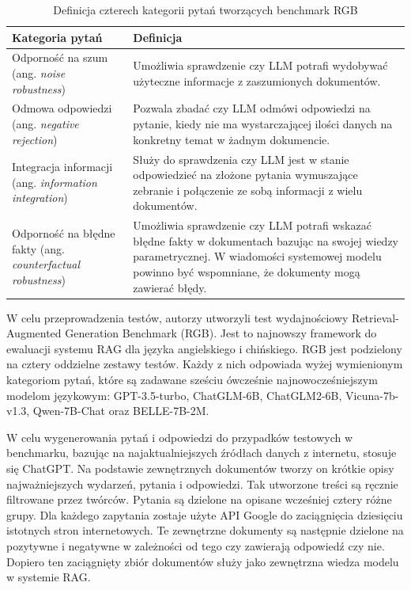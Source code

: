     \begin{table}[h]
        \centering
        \caption{ Definicja czterech kategorii pytań tworzących benchmark RGB }
        \begin{tabularx}{\textwidth}{|p{4.5cm}|X|}
        \hline
        \textbf{Kategoria pytań} & \textbf{Definicja} \\
        \hline
        Odporność na szum (ang. \textit{noise robustness}) & Umożliwia sprawdzenie czy LLM potrafi wydobywać użyteczne informacje z zaszumionych dokumentów.  \\ \hline
        
        Odmowa odpowiedzi (ang. \textit{negative rejection}) & Pozwala zbadać czy LLM odmówi odpowiedzi na pytanie, kiedy nie ma wystarczającej ilości danych na konkretny temat w żadnym dokumencie.  \\ \hline
        
        Integracja informacji (ang. \textit{information integration}) & Służy do sprawdzenia czy LLM jest w stanie odpowiedzieć na złożone pytania wymuszające zebranie i połączenie ze sobą informacji z wielu dokumentów. \\ \hline

        Odporność na błędne fakty (ang. \textit{counterfactual robustness}) & Umożliwia sprawdzenie czy LLM potrafi wskazać błędne fakty w dokumentach bazując na swojej wiedzy parametrycznej. W wiadomości systemowej modelu powinno być wspomniane, że dokumenty mogą zawierać błędy. \\ \hline
        \end{tabularx}
        \label{rgb_kategorie_pytan}
    \end{table}

    \noindent W celu przeprowadzenia testów, autorzy utworzyli test wydajnościowy Retrieval-Augmented Generation Benchmark (RGB). Jest to najnowszy framework do ewaluacji systemu RAG dla języka angielskiego i chińskiego. RGB jest podzielony na cztery oddzielne zestawy testów. Każdy z nich odpowiada wyżej wymienionym kategoriom pytań, które są zadawane sześciu ówcześnie najnowocześniejszym modelom językowym: GPT-3.5-turbo, ChatGLM-6B, ChatGLM2-6B, Vicuna-7b-v1.3, Qwen-7B-Chat oraz BELLE-7B-2M.

    W celu wygenerowania pytań i odpowiedzi do przypadków testowych w benchmarku, bazując na najaktualniejszych źródłach danych z internetu, stosuje się ChatGPT. Na podstawie zewnętrznych dokumentów tworzy on krótkie opisy najważniejszych wydarzeń, pytania i odpowiedzi. Tak utworzone treści są ręcznie filtrowane przez twórców. Pytania są dzielone na opisane wcześniej cztery różne grupy. Dla każdego zapytania zostaje użyte API Google do zaciągnięcia dziesięciu istotnych stron internetowych. Te zewnętrzne dokumenty są następnie dzielone na pozytywne i negatywne w zależności od tego czy zawierają odpowiedź czy nie. Dopiero ten zaciągnięty zbiór dokumentów służy jako zewnętrzna wiedza modelu w systemie RAG.

